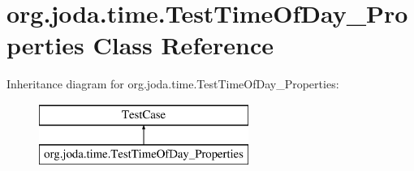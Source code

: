 \hypertarget{classorg_1_1joda_1_1time_1_1_test_time_of_day___properties}{\section{org.\-joda.\-time.\-Test\-Time\-Of\-Day\-\_\-\-Properties Class Reference}
\label{classorg_1_1joda_1_1time_1_1_test_time_of_day___properties}
}
Inheritance diagram for org.\-joda.\-time.\-Test\-Time\-Of\-Day\-\_\-\-Properties\-:\begin{figure}[H]
\begin{center}
\leavevmode
\includegraphics[height=2.000000cm]{classorg_1_1joda_1_1time_1_1_test_time_of_day___properties}
\end{center}
\end{figure}
